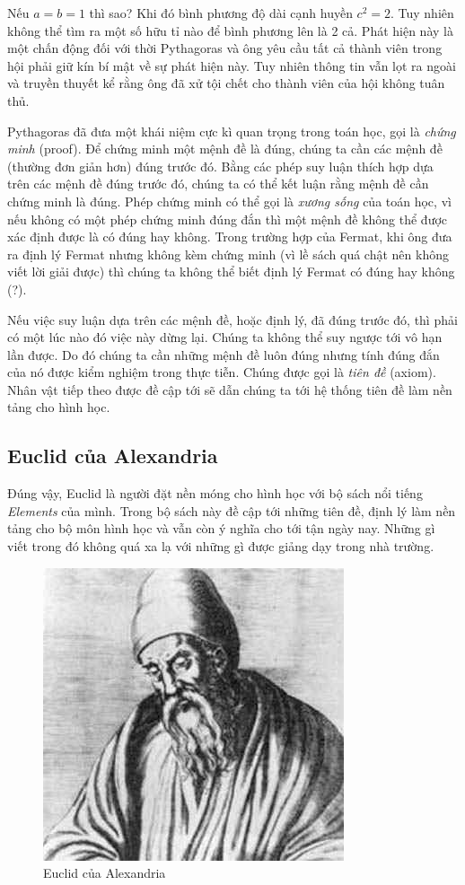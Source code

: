 Nếu $a = b = 1$ thì sao? Khi đó bình phương độ dài cạnh huyền $c^2 = 2$. Tuy nhiên không thể tìm ra một số hữu tỉ nào để bình phương lên là 2 cả. Phát hiện này là một chấn động đối với thời Pythagoras và ông yêu cầu tất cả thành viên trong hội phải giữ kín bí mật về sự phát hiện này. Tuy nhiên thông tin vẫn lọt ra ngoài và truyền thuyết kể rằng ông đã xử tội chết cho thành viên của hội không tuân thủ.

Pythagoras đã đưa một khái niệm cực kì quan trọng trong toán học, gọi là \textit{chứng minh} (proof). Để chứng minh một mệnh đề là đúng, chúng ta cần các mệnh đề (thường đơn giản hơn) đúng trước đó. Bằng các phép suy luận thích hợp dựa trên các mệnh đề đúng trước đó, chúng ta có thể kết luận rằng mệnh đề cần chứng minh là đúng. Phép chứng minh có thể gọi là \textit{xương sống} của toán học, vì nếu không có một phép chứng minh đúng đắn thì một mệnh đề không thể được xác định được là có đúng hay không. Trong trường hợp của Fermat, khi ông đưa ra định lý Fermat nhưng không kèm chứng minh (vì lề sách quá chật nên không viết lời giải được) thì chúng ta không thể biết định lý Fermat có đúng hay không (?).

Nếu việc suy luận dựa trên các mệnh đề, hoặc định lý, đã đúng trước đó, thì phải có một lúc nào đó việc này dừng lại. Chúng ta không thể suy ngược tới vô hạn lần được. Do đó chúng ta cần những mệnh đề luôn đúng nhưng tính đúng đắn của nó được kiểm nghiệm trong thực tiễn. Chúng được gọi là \textit{tiên đề} (axiom). Nhân vật tiếp theo được đề cập tới sẽ dẫn chúng ta tới hệ thống tiên đề làm nền tảng cho hình học.

\subsection*{Euclid của Alexandria}

Đúng vậy, Euclid là người đặt nền móng cho hình học với bộ sách nổi tiếng \textit{Elements} của mình. Trong bộ sách này đề cập tới những tiên đề, định lý làm nền tảng cho bộ môn hình học và vẫn còn ý nghĩa cho tới tận ngày nay. Những gì viết trong đó không quá xa lạ với những gì được giảng dạy trong nhà trường.

\begin{figure}[ht]
	\centering
	\includegraphics[scale=0.5]{analytic_geometry/Euclid.jpeg}
	\caption{Euclid của Alexandria}
\end{figure}

